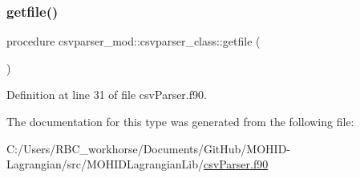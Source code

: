\subsubsection{\texorpdfstring{getfile()}{getfile()}}
{\footnotesize\ttfamily procedure csvparser\+\_\+mod\+::csvparser\+\_\+class\+::getfile (\begin{DoxyParamCaption}{ }\end{DoxyParamCaption})\hspace{0.3cm}{\ttfamily [private]}}



Definition at line 31 of file csv\+Parser.\+f90.



The documentation for this type was generated from the following file\+:\begin{DoxyCompactItemize}
\item 
C\+:/\+Users/\+R\+B\+C\+\_\+workhorse/\+Documents/\+Git\+Hub/\+M\+O\+H\+I\+D-\/\+Lagrangian/src/\+M\+O\+H\+I\+D\+Lagrangian\+Lib/\mbox{\hyperlink{csv_parser_8f90}{csv\+Parser.\+f90}}\end{DoxyCompactItemize}
